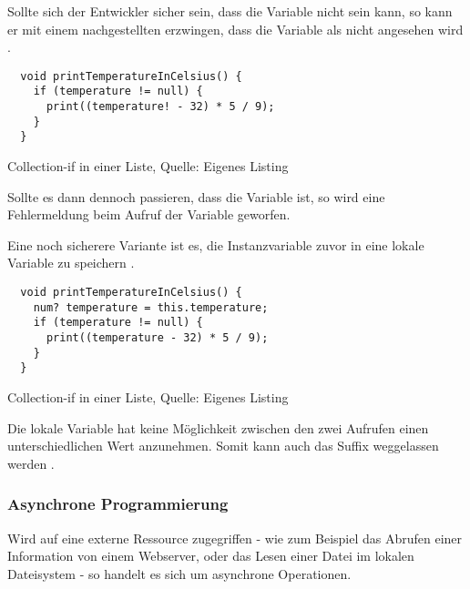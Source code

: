 Sollte sich der Entwickler sicher sein, dass die Variable nicht  sein kann, so kann er mit einem nachgestellten \IC{!} erzwingen, dass die Variable als nicht  angesehen wird .

\ifincludeall
  \begin{listing}[ht]
    \begin{verbatim}
  void printTemperatureInCelsius() {
    if (temperature != null) {
      print((temperature! - 32) * 5 / 9);
    }
  }
    \end{verbatim}
    \caption[Collection-if in einer Liste]{Collection-if in einer Liste, Quelle: Eigenes Listing}
    \label{lst:printTemperatureInCelsiusLocalVariableForceNullCheck}
  \end{listing}
\fi

Sollte es dann dennoch passieren, dass die Variable  ist, so wird eine Fehlermeldung beim Aufruf der Variable geworfen.



Eine noch sicherere Variante ist es, die Instanzvariable zuvor in eine lokale Variable zu speichern .

\ifincludeall
  \begin{listing}[ht]
    \begin{verbatim}
  void printTemperatureInCelsius() {
    num? temperature = this.temperature;
    if (temperature != null) {
      print((temperature - 32) * 5 / 9);
    }
  }
    \end{verbatim}
    \caption[Collection-if in einer Liste]{Collection-if in einer Liste, Quelle: Eigenes Listing}
    \label{lst:printTemperatureInCelsiusLocalVariable}
  \end{listing}
\fi

Die lokale Variable hat keine Möglichkeit zwischen den zwei Aufrufen einen unterschiedlichen Wert anzunehmen.
Somit kann auch das Suffix \IC{!} weggelassen werden .



\subsubsection{Asynchrone Programmierung}

Wird auf eine externe Ressource zugegriffen - wie zum Beispiel das Abrufen einer Information von einem Webserver, oder das Lesen einer Datei im lokalen Dateisystem - so handelt es sich um asynchrone Operationen.

